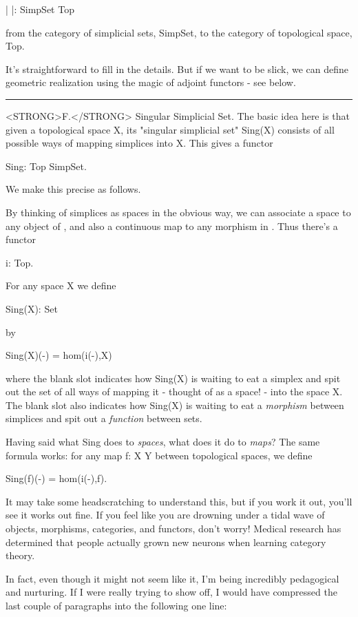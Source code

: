                 | |: SimpSet \to  Top

from the category of simplicial sets, SimpSet, to the category of
topological space, Top.  

It's straightforward to fill in the details.  But if we want to be
slick, we can define geometric realization using the magic of
adjoint functors - see below.

\par\noindent\rule{\textwidth}{0.4pt}
<STRONG>F.</STRONG>  Singular Simplicial Set.  The basic idea here is that given a
topological space X, its "singular simplicial set" Sing(X) consists of
all possible ways of mapping simplices into X.  This gives a functor

                 Sing: Top \to  SimpSet.

We make this precise as follows.

By thinking of simplices as spaces in the obvious way, we can 
associate a space to any object of \Delta , and also a continuous map 
to any morphism in \Delta .  Thus there's a functor

                 i: \Delta  \to  Top.

For any space X we define 

                 Sing(X): \Delta  \to  Set

by 

                 Sing(X)(-) = hom(i(-),X) 

where the blank slot indicates how Sing(X) is waiting to eat a simplex
and spit out the set of all ways of mapping it - thought of as a
space! - into the space X.  The blank slot also indicates how Sing(X)
is waiting to eat a \emph{morphism} between simplices and spit out a
\emph{function} between sets.  

Having said what Sing does to \emph{spaces}, what does it do to \emph{maps}?  The
same formula works: for any map f: X \to  Y between topological spaces,
we define

                 Sing(f)(-) = hom(i(-),f).

It may take some headscratching to understand this, but if you work it
out, you'll see it works out fine.  If you feel like you are drowning
under a tidal wave of objects, morphisms, categories, and functors,
don't worry!  Medical research has determined that people actually grown
new neurons when learning category theory.

In fact, even though it might not seem like it, I'm being incredibly
pedagogical and nurturing.  If I were really trying to show off, I would
have compressed the last couple of paragraphs into the following one
line:


